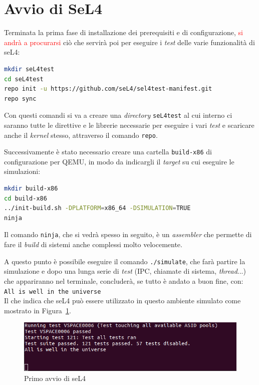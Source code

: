 \section{Avvio di SeL4}
Terminata la prima fase di installazione dei prerequisiti e di configurazione, \textcolor{red}{si andrà a procurarsi} ciò che servirà poi per eseguire i \textit{test} delle varie funzionalità di seL4:
\begin{lstlisting}[language=bash]
mkdir seL4test
cd seL4test
repo init -u https://github.com/seL4/sel4test-manifest.git
repo sync
\end{lstlisting}

Con questi comandi si va a creare una \textit{directory} \texttt{seL4test} al cui interno ci saranno tutte le direttive e le librerie necessarie per eseguire i vari \textit{test} e scaricare anche il \textit{kernel} stesso, attraverso il comando \texttt{repo}.

Successivamente è stato necessario creare una cartella \texttt{build-x86} di configurazione per QEMU, in modo da indicargli il \textit{target} su cui eseguire le simulazioni:
\begin{lstlisting}[language=bash]
mkdir build-x86
cd build-x86
../init-build.sh -DPLATFORM=x86_64 -DSIMULATION=TRUE
ninja
\end{lstlisting}

Il comando \texttt{ninja}, che si vedrà spesso in seguito, è un \textit{assembler} che permette di fare il \textit{build} di sistemi anche complessi molto velocemente.

A questo punto è possibile eseguire il comando \texttt{./simulate}, che farà partire la simulazione e dopo una lunga serie di \textit{test} (IPC, chiamate di sistema, \textit{thread}...) che appariranno nel terminale, concluderà, se tutto è andato a buon fine, con:\\
\texttt{All is well in the universe}\\
Il che indica che seL4 può essere utilizzato in questo ambiente simulato come mostrato in Figura~\ref{fig:PrimaSimulazione}.
\begin{figure}[H]
  \includegraphics[width=\linewidth]{img/PrimaSimulazione.png}
  \caption{Primo avvio di seL4}
  \label{fig:PrimaSimulazione}
\end{figure}

